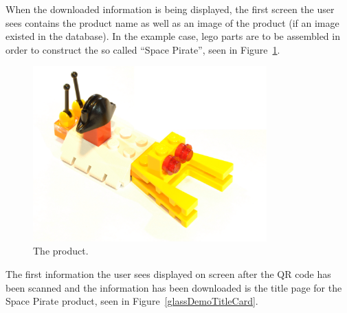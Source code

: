 When the downloaded information is being displayed, the first screen the user sees contains the product name as well as an image of the product (if an image existed in the database). In the example case, lego parts are to be assembled in order to construct the so called ``Space Pirate'', seen in Figure~\ref{glassDemoRaw}.

	\begin{figure}[ht!]
		\centering
		\includegraphics[width=90mm]{images/rawImages/BILD_6}
		\caption{The product.}
		\label{glassDemoRaw}
	\end{figure}

The first information the user sees displayed on screen after the QR code has been scanned and the information has been downloaded is the title page for the Space Pirate product, seen in Figure~\ref{glassDemoTitleCard}.

	
